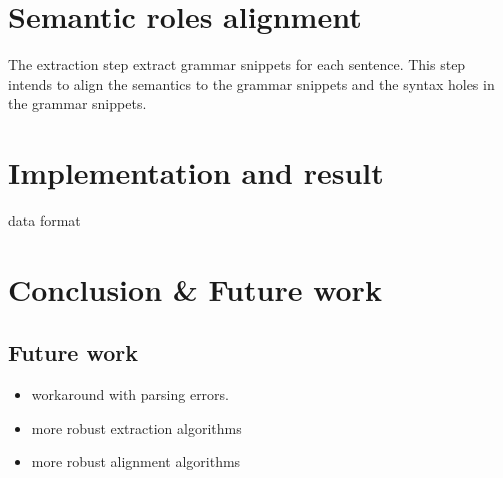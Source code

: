 \documentclass[a4paper]{article}
\begin{document}
\section{Semantic roles alignment}
The extraction step extract grammar snippets for each sentence. This step intends to align the semantics to the grammar snippets and the syntax holes in the grammar snippets.


\section{Implementation and result}
data format
\section{Conclusion \& Future work}
\subsection{Future work}
\begin{itemize}
    \item workaround with parsing errors.
    \item more robust extraction algorithms
    \item more robust alignment algorithms
\end{itemize}
\end{document}
